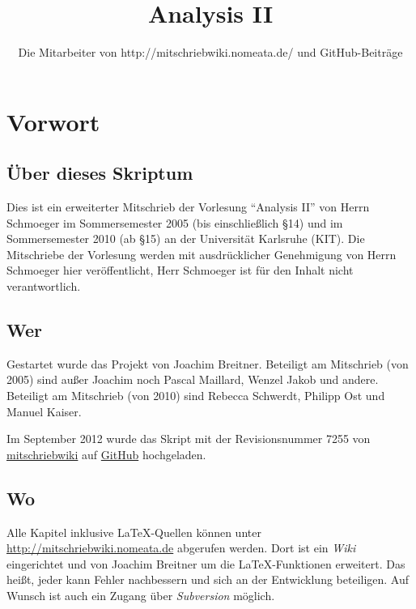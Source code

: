 \documentclass[a4paper,oneside,DIV15,BCOR12mm,chapterprefix=true,headings=onelinechapter]{scrbook}
\author{Die Mitarbeiter von http://mitschriebwiki.nomeata.de/ und GitHub-Beiträge}
\title{Analysis II}
\begin{document}
\maketitle

\renewcommand{\thechapter}{\Roman{chapter}}
\tableofcontents

\chapter*{Vorwort}

\section*{Über dieses Skriptum}
Dies ist ein erweiterter Mitschrieb der Vorlesung "`Analysis II"' von Herrn Schmoeger im
Sommersemester 2005 (bis einschließlich §14) und im Sommersemester 2010 (ab §15) an der Universität 
Karlsruhe (KIT). Die Mitschriebe der Vorlesung werden mit ausdrücklicher Genehmigung 
von Herrn Schmoeger hier veröffentlicht, Herr Schmoeger ist für den Inhalt nicht 
verantwortlich.

\section*{Wer}
Gestartet wurde das Projekt von Joachim Breitner. Beteiligt am Mitschrieb (von 2005) sind außer Joachim
noch Pascal Maillard, Wenzel Jakob und andere. 
Beteiligt am Mitschrieb (von 2010) sind Rebecca Schwerdt, Philipp Ost und Manuel Kaiser.

Im September 2012 wurde das Skript mit der Revisionsnummer 7255 von 
\href{http://svn.nomeata.de/wsvn/mitschriebwiki/SS10/Ana2Bachelor.tex?op=log&}{mitschriebwiki}
auf \href{https://github.com/MartinThoma/LaTeX-examples/blob/master/documents/Analysis%20II}{GitHub} hochgeladen.

\section*{Wo}
Alle Kapitel inklusive \LaTeX-Quellen können unter \url{http://mitschriebwiki.nomeata.de} abgerufen werden.
Dort ist ein \emph{Wiki} eingerichtet und von Joachim Breitner um die \LaTeX-Funktionen erweitert.
Das heißt, jeder kann Fehler nachbessern und sich an der Entwicklung
beteiligen. Auf Wunsch ist auch ein Zugang über \emph{Subversion} möglich.
\end{document}

